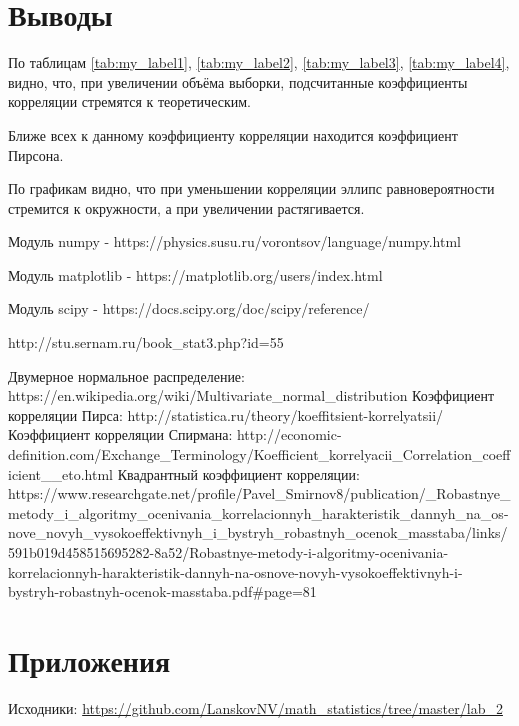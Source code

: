 \documentclass[12pt]{article}
\begin{document}
\newpage
\section{Выводы}

По таблицам \ref{tab:my_label1}, \ref{tab:my_label2}, \ref{tab:my_label3}, \ref{tab:my_label4}, видно, что, при увеличении объёма выборки, подсчитанные коэффициенты корреляции стремятся к теоретическим.

Ближе всех к данному коэффициенту корреляции находится коэффициент Пирсона.

По графикам видно, что при уменьшении корреляции эллипс равновероятности стремится к окружности, а при увеличении растягивается.



\begin{thebibliography}{}
      Модуль numpy  -  https://physics.susu.ru/vorontsov/language/numpy.html
    
    Модуль matplotlib - https://matplotlib.org/users/index.html
    
    Модуль scipy - https://docs.scipy.org/doc/scipy/reference/
    
    http://stu.sernam.ru/book\_stat3.php?id=55
    
Двумерное нормальное распределение: https://en.wikipedia.org/wiki/Multivariate\_normal\_distribution
Коэффициент корреляции Пирса: http://statistica.ru/theory/koeffitsient-korrelyatsii/ 
Коэффициент корреляции Спирмана: 
http://economic-definition.com/Exchange\_Terminology/Koefficient\_korrelyacii\_Correlation\_coefficient\_\_eto.html
 Квадрантный коэффициент корреляции: https://www.researchgate.net/profile/Pavel\_Smirnov8/publication/\_Robastnye\_metody\_i\_algoritmy\_ocenivania\_korrelacionnyh\_harakteristik\_dannyh\_na\_os\do-nove\_novyh\_vysokoeffektivnyh\_i\_bystryh\_robastnyh\_ocenok\_masstaba/links/591b019d458515695282\do-8a52/Robastnye-metody-i-algoritmy-ocenivania-korrelacionnyh-harakteristik-dannyh-na-osnove-novyh-vysokoeffektivnyh-i-bystryh-robastnyh-ocenok-masstaba.pdf\#page=81

\end{thebibliography}


\section{Приложения}

Исходники: \url{https://github.com/LanskovNV/math_statistics/tree/master/lab_2}
\end{document}
